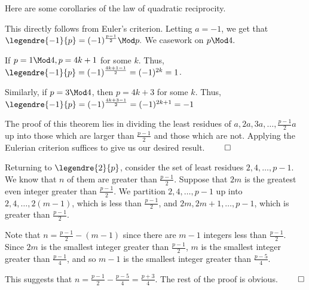 \documentclass[a4paper, 12pt,oneside,openany]{book}
\begin{document}
Here are some corollaries of the law of quadratic reciprocity.


 This directly follows from Euler's criterion. Letting $a=-1$, we get that $\legendre{-1}{p}=(-1)^{\frac{p-1}{2}} \Mod p.$ We casework on $p \Mod 4.$

If $p = 1\Mod 4, p=4k+1$ for some $k$. Thus, $\legendre{-1}{p}=(-1)^{\frac{4k+1-1}{2}}=(-1)^{2k}=1$.

Similarly, if $p = 3\Mod 4$, then $p=4k+3$ for some $k$. Thus, $\legendre{-1}{p}=(-1)^{\frac{4k+3-1}{2}}=(-1)^{2k+1}=-1$



The proof of this theorem lies in dividing the least residues of $a, 2a, 3a, \dots, \frac{p-1}{2}a$ up into those which are larger than $\frac{p-1}{2}$ and those which are not. Applying the Eulerian criterion suffices to give us our desired result. $\qed$

Returning to $\legendre{2}{p}$, consider the set of least residues $2, 4, \dots, p-1$. We know that $n$ of them are greater than $\frac{p-1}{2}$. Suppose that $2m$ is the greatest even integer greater than $\frac{p-1}{2}$. We partition $2, 4, \dots, p-1$ up into $2, 4, \dots, 2(m-1)$, which is less than $\frac{p-1}{2}$, and $2m, 2m+1, \dots, p-1$, which is greater than $\frac{p-1}{2}$. 

Note that $n=\frac{p-1}{2}-(m-1)$ since there are $m-1$ integers less than $\frac{p-1}{2}$. Since $2m$ is the smallest integer greater than $\frac{p-1}{2}$, $m$ is the smallest integer greater than $\frac{p-1}{4}$, and so $m-1$ is the smallest integer greater than $\frac{p-5}{4}.$

This suggests that $n=\frac{p-1}{2}-\frac{p-5}{4}=\frac{p+3}{4}.$ The rest of the proof is obvious. $\qed$
\end{document}
